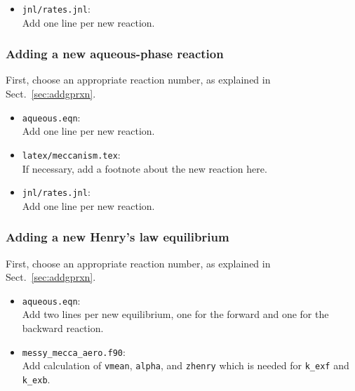 \documentclass[twoside]{article}
\def\nosep{\setlength\parsep{0mm}\setlength\topsep{0mm}\setlength\itemsep{0mm}}
\begin{document}
\begin{itemize}\nosep
\item \verb|jnl/rates.jnl|:\\
  Add one line per new reaction.
\end{itemize}

\subsubsection{Adding a new aqueous-phase reaction}

First, choose an appropriate reaction number, as explained in
Sect.~\ref{sec:addgprxn}.

\begin{itemize}\nosep
\item \verb|aqueous.eqn|:\\
  Add one line per new reaction.
\end{itemize}

\begin{itemize}\nosep
\item \verb|latex/meccanism.tex|:\\
  If necessary, add a footnote about the new reaction here.
\end{itemize}

\begin{itemize}\nosep
\item \verb|jnl/rates.jnl|:\\
  Add one line per new reaction.
\end{itemize}

\subsubsection{Adding a new Henry's law equilibrium}

First, choose an appropriate reaction number, as explained in
Sect.~\ref{sec:addgprxn}.

\begin{itemize}\nosep
\item \verb|aqueous.eqn|:\\
  Add two lines per new equilibrium, one for the forward and one for the
  backward reaction.
\end{itemize}

\begin{itemize}\nosep
\item \verb|messy_mecca_aero.f90|:\\
  Add calculation of \verb|vmean|, \verb|alpha|, and \verb|zhenry| which
  is needed for \verb|k_exf| and \verb|k_exb|.
\end{itemize}
\end{document}
